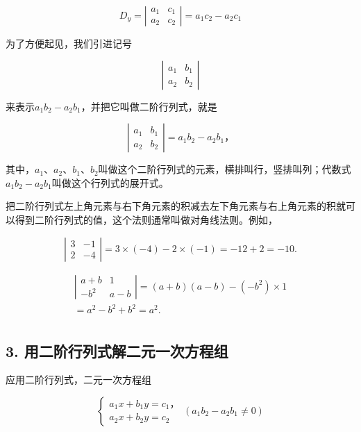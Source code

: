 \[
D_y = \left|\begin{array}{cc}a_1 & c_1\\a_2 & c_2\end{array}\right| = a_1c_2 - a_2c_1
\]

为了方便起见，我们引进记号

\[
\left| \begin{array}{cc} a _ {1} & b _ {1} \\ a _ {2} & b _ {2} \end{array} \right|
\]

来表示\(a_{1}b_{2}-a_{2}b_{1}\)，并把它叫做二阶行列式，就是

\[
\left| \begin{array}{cc} a _ {1} & b _ {1} \\ a _ {2} & b _ {2} \end{array} \right| = a _ {1} b _ {2} - a _ {2} b _ {1}\text{，}
\]

其中，\(a_{1}\)、\(a_{2}\)、\(b_{1}\)、\(b_{2}\)叫做这个二阶行列式的元素，横排叫行，竖排叫列；代数式\(a_{1}b_{2}-a_{2}b_{1}\)叫做这个行列式的展开式。

把二阶行列式左上角元素与右下角元素的积减去左下角元素与右上角元素的积就可以得到二阶行列式的值，这个法则通常叫做对角线法则。例如，

\[
\left| \begin{array}{cc} 3 & - 1 \\ 2 & - 4 \end{array} \right| = 3 \times (- 4) - 2 \times (- 1) = - 12 + 2 = - 10.
\]

\[
\begin{array}{l} \left| \begin{array}{cc} a + b & 1 \\ - b ^ {2} & a - b \end{array} \right| = (a + b) (a - b) - (- b ^ {2}) \times 1 \\ = a ^ {2} - b ^ {2} + b ^ {2} = a ^ {2}. \\ \end{array}
\]

\subsection{3. 用二阶行列式解二元一次方程组}

应用二阶行列式，二元一次方程组

\[
\left\{ \begin{array}{l} a _ {1} x + b _ {1} y = c _ {1}\text{，} \\ a _ {2} x + b _ {2} y = c _ {2} \end{array} \right. (a _ {1} b _ {2} - a _ {2} b _ {1} \neq 0) \tag{I}
\]

